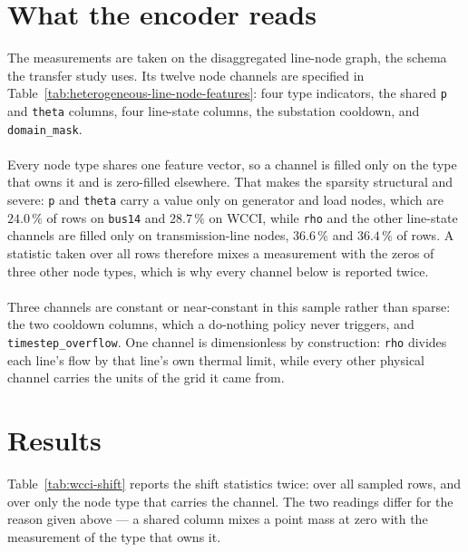 \section{What the encoder reads}
\label{sec:wcci-features}

The measurements are taken on the disaggregated line-node graph, the schema the
transfer study uses. Its twelve node channels are specified in
Table~\ref{tab:heterogeneous-line-node-features}: four type indicators, the
shared \texttt{p} and \texttt{theta} columns, four line-state columns, the
substation cooldown, and \texttt{domain\_mask}.
\\
\\
Every node type shares one feature vector, so a channel is filled only on the
type that owns it and is zero-filled elsewhere. That makes the sparsity
structural and severe: \texttt{p} and \texttt{theta} carry a value only on
generator and load nodes, which are $24.0\,\%$ of rows on \texttt{bus14} and
$28.7\,\%$ on WCCI, while \texttt{rho} and the other line-state channels are
filled only on transmission-line nodes, $36.6\,\%$ and $36.4\,\%$ of rows. A
statistic taken over all rows therefore mixes a measurement with the zeros of
three other node types, which is why every channel below is reported twice.
\\
\\
Three channels are constant or near-constant in this sample rather than sparse:
the two cooldown columns, which a do-nothing policy never triggers, and
\texttt{timestep\_overflow}. One channel is dimensionless by construction:
\texttt{rho} divides each line's flow by that line's own thermal limit, while
every other physical channel carries the units of the grid it came from.


\section{Results}
\label{sec:wcci-results}

Table~\ref{tab:wcci-shift} reports the shift statistics twice: over all sampled
rows, and over only the node type that carries the channel. The two readings
differ for the reason given above --- a shared column mixes a point mass at zero
with the measurement of the type that owns it.

